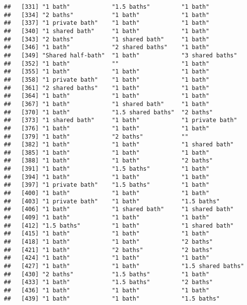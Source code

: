 \documentclass[
]{article}
\begin{document}
\begin{verbatim}
##   [331] "1 bath"            "1.5 baths"         "1 bath"           
##   [334] "2 baths"           "1 bath"            "1 bath"           
##   [337] "1 private bath"    "1 bath"            "1 bath"           
##   [340] "1 shared bath"     "1 bath"            "1 bath"           
##   [343] "2 baths"           "1 shared bath"     "1 bath"           
##   [346] "1 bath"            "2 shared baths"    "1 bath"           
##   [349] "Shared half-bath"  "1 bath"            "3 shared baths"   
##   [352] "1 bath"            ""                  "1 bath"           
##   [355] "1 bath"            "1 bath"            "1 bath"           
##   [358] "1 private bath"    "1 bath"            "1 bath"           
##   [361] "2 shared baths"    "1 bath"            "1 bath"           
##   [364] "1 bath"            "1 bath"            "1 bath"           
##   [367] "1 bath"            "1 shared bath"     "1 bath"           
##   [370] "1 bath"            "1.5 shared baths"  "2 baths"          
##   [373] "1 shared bath"     "1 bath"            "1 private bath"   
##   [376] "1 bath"            "1 bath"            "1 bath"           
##   [379] "1 bath"            "2 baths"           ""                 
##   [382] "1 bath"            "1 bath"            "1 shared bath"    
##   [385] "1 bath"            "1 bath"            "1 bath"           
##   [388] "1 bath"            "1 bath"            "2 baths"          
##   [391] "1 bath"            "1.5 baths"         "1 bath"           
##   [394] "1 bath"            "1 bath"            "1 bath"           
##   [397] "1 private bath"    "1.5 baths"         "1 bath"           
##   [400] "1 bath"            "1 bath"            "1 bath"           
##   [403] "1 private bath"    "1 bath"            "1.5 baths"        
##   [406] "1 bath"            "1 shared bath"     "1 shared bath"    
##   [409] "1 bath"            "1 bath"            "1 bath"           
##   [412] "1.5 baths"         "1 bath"            "1 shared bath"    
##   [415] "1 bath"            "1 bath"            "1 bath"           
##   [418] "1 bath"            "1 bath"            "2 baths"          
##   [421] "1 bath"            "2 baths"           "2 baths"          
##   [424] "1 bath"            "1 bath"            "1 bath"           
##   [427] "1 bath"            "1 bath"            "1.5 shared baths" 
##   [430] "2 baths"           "1.5 baths"         "1 bath"           
##   [433] "1 bath"            "1.5 baths"         "2 baths"          
##   [436] "1 bath"            "1 bath"            "1 bath"           
##   [439] "1 bath"            "1 bath"            "1.5 baths"        

\end{verbatim}
\end{document}
